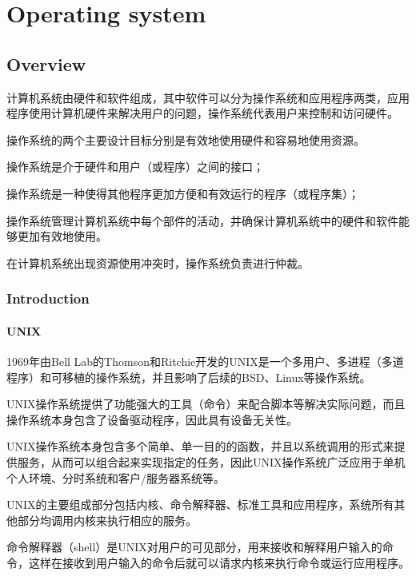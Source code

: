 \part{Operating system}

\chapter{Overview}


计算机系统由硬件和软件组成，其中软件可以分为操作系统和应用程序两类，应用程序使用计算机硬件来解决用户的问题，操作系统代表用户来控制和访问硬件。

操作系统的两个主要设计目标分别是有效地使用硬件和容易地使用资源。

\begin{compactitem}
\item 操作系统是介于硬件和用户（或程序）之间的接口；
\item 操作系统是一种使得其他程序更加方便和有效运行的程序（或程序集）；
\item 操作系统管理计算机系统中每个部件的活动，并确保计算机系统中的硬件和软件能够更加有效地使用。
\item 在计算机系统出现资源使用冲突时，操作系统负责进行仲裁。
\end{compactitem}



\section{Introduction}


\subsection{UNIX}


1969年由Bell Lab的Thomson和Ritchie开发的UNIX是一个多用户、多进程（多道程序）和可移植的操作系统，并且影响了后续的BSD、Linux等操作系统。

UNIX操作系统提供了功能强大的工具（命令）来配合脚本等解决实际问题，而且操作系统本身包含了设备驱动程序，因此具有设备无关性。

UNIX操作系统本身包含多个简单、单一目的的函数，并且以系统调用的形式来提供服务，从而可以组合起来实现指定的任务，因此UNIX操作系统广泛应用于单机个人环境、分时系统和客户/服务器系统等。


UNIX的主要组成部分包括内核、命令解释器、标准工具和应用程序，系统所有其他部分均调用内核来执行相应的服务。

命令解释器（shell）是UNIX对用户的可见部分，用来接收和解释用户输入的命令，这样在接收到用户输入的命令后就可以请求内核来执行命令或运行应用程序。


